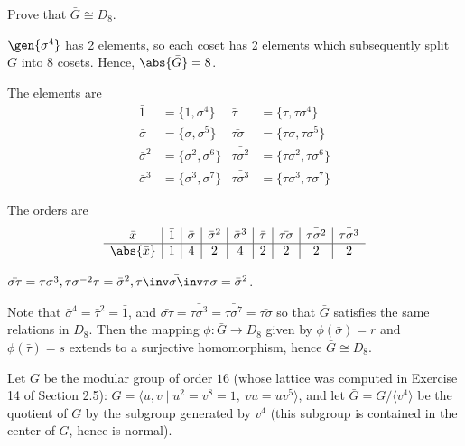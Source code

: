 \begin{problems}
\begin{problems}
        \item Prove that $\bar{G} \cong D_8$.
    \end{problems}
    \begin{solalph}
        \item $\gen{\sigma^4}$ has 2 elements, so each coset has 2 elements which subsequently split $G$ into 8 cosets. Hence, $\abs{\bar G} = 8$.
        \item The elements are
        \begin{align*}
            \bar 1 & = \{1, \sigma^4\} & \bar\tau & = \{\tau, \tau\sigma^4\} \\
            \bar\sigma & = \{\sigma, \sigma^5\} & \bar{\tau\sigma} & = \{\tau\sigma, \tau\sigma^5\} \\
            \bar\sigma^2 & = \{\sigma^2, \sigma^6\} & \bar{\tau\sigma^2} & = \{\tau\sigma^2, \tau\sigma^6\} \\
            \bar\sigma^3 & = \{\sigma^3, \sigma^7\} & \bar{\tau\sigma^3} & = \{\tau\sigma^3, \tau\sigma^7\}
        \end{align*}
        \item The orders are
        \[
        \begin{array}{c|c|c|c|c|c|c|c|c}
            \bar x & \bar 1 & \bar\sigma & \bar\sigma^2 & \bar\sigma^3 & \bar\tau & \bar{\tau\sigma} & \bar{\tau\sigma^2} & \bar{\tau\sigma^3} \\
            \hline
            \abs{\bar x} & 1 & 4 & 2 & 4 & 2 & 2 & 2 & 2
        \end{array}
        \]
        \item $\bar{\sigma\tau} = \bar{\tau\sigma^3}, \bar{\tau\sigma^{-2}\tau} = \bar\sigma^2, \bar{\tau\inv\sigma\inv\tau\sigma} = \bar\sigma^2$.
        \item Note that $\bar\sigma^4 = \bar\tau^2 = \bar 1$, and $\bar{\sigma\tau} = \bar{\tau\sigma^3} = \bar{\tau\sigma^7} = \bar{\tau\sigma}$ so that $\bar G$ satisfies the same relations in $D_8$. Then the mapping $\phi : \bar G \to D_8$ given by $\phi(\bar\sigma) = r$ and $\phi(\bar\tau) = s$ extends to a surjective homomorphism, hence $\bar G \cong D_8$.
    \end{solalph}
    \item Let $G$ be the modular group of order $16$ (whose lattice was computed in Exercise 14 of Section 2.5): $G = \langle u,v \mid u^2 = v^8 = 1,\ vu = uv^5 \rangle$, and let $\bar{G} = G/\langle v^4 \rangle$ be the quotient of $G$ by the subgroup generated by $v^4$ (this subgroup is contained in the center of $G$, hence is normal).

\end{problems}
